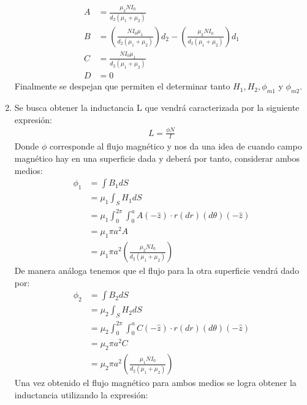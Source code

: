 \documentclass[
  11pt,
  letterpaper,
   addpoints,
   answers
  ]{exam}
\begin{document}
\begin{questions}
\begin{solution}
\begin{enumerate}
        \begin{align}
        A &= \frac{\mu_{2} N I_{0}}{d_{2}(\mu_{1} + \mu_{2})}\\
         B&= \left(\frac{NI_{0}\mu_{1}}{d_{2}(\mu_{1} + \mu_{2})}\right) d_{2} - \left(\frac{\mu_{2} N I_{0}}{d_{2}(\mu_{1} + \mu_{2})}\right)d_{1}\\
         C&= \frac{NI_{0}\mu_{1}}{d_{2}(\mu_{1} + \mu_{2})}\\
         D&=0
        \end{align}
        Finalmente se despejan que permiten el determinar tanto $H_{1} , H_{2},\phi_{m1}$  y $\phi_{m2} $.
        \item Se busca obtener la inductancia L que vendrá caracterizada por la siguiente expresión: 
        \begin{align}
            L = \frac{\phi N}{I}
        \end{align}
        Donde $\phi$ corresponde al flujo magnético y nos da una idea de cuando campo magnético hay en una superficie dada y deberá por tanto, considerar ambos medios:
        \begin{align}
            \phi_{1} &= \int B_{1} dS\\
                     &= \mu_{1} \int_{S} H_{1} dS\\
                     &= \mu_{1} \int_{0}^{2\pi} \int_{0}^{a} A (-\hat{z}) \cdot r (dr) (d\theta) (-\hat{z})  \\
                     &= \mu_{1}  \pi a^{2} A\\
                     &= \mu_{1}\pi a^{2} \left(\frac{\mu_{2} N I_{0}}{d_{2}(\mu_{1} + \mu_{2})}\right)
          \end{align}
        De manera análoga tenemos que el flujo para la otra superficie vendrá dado por:
        \begin{align}
            \phi_{2} &= \int B_{2} dS\\
                     &= \mu_{2} \int_{S} H_{2} dS\\
                     &= \mu_{2} \int_{0}^{2\pi} \int_{0}^{a} C (-\hat{z}) \cdot r (dr) (d\theta) (-\hat{z})  \\
                     &= \mu_{2}  \pi a^{2} C\\
                     &= \mu_{2}\pi a^{2} \left(\frac{\mu_{1} N I_{0}}{d_{2}(\mu_{1} + \mu_{2})}\right)
          \end{align}
        Una vez obtenido el flujo magnético para ambos medios se logra obtener la inductancia utilizando la expresión:
        \begin{align}

\end{align}
\end{enumerate}
\end{solution}
\end{questions}
\end{document}
